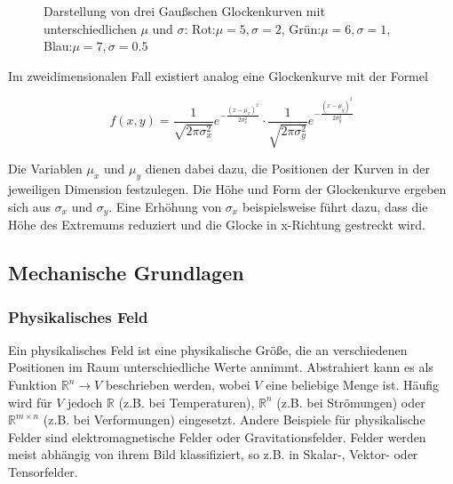 \documentclass[a4paper,fontsize=12pt,toc=bib,halfparskip]{scrartcl}
\begin{document}
\begin{figure}
	\centering
	\caption{Darstellung von drei Gau{\ss}schen Glockenkurven mit unterschiedlichen $\mu$ und $\sigma$: Rot:$\mu=5, \sigma=2$, Gr\"un:$\mu=6, \sigma=1$, Blau:$\mu=7, \sigma=0.5$}
	\label{Gauss}
\end{figure}

Im zweidimensionalen Fall existiert analog eine Glockenkurve mit der Formel

\begin{equation}
	f(x,y) = 
	\frac{1}{\sqrt{2\pi \sigma_x^2}}e^{-\frac{(x-\mu_x)^2}{2\sigma_x^2}} \cdot 
	\frac{1}{\sqrt{2\pi \sigma_y^2}}e^{-\frac{(x-\mu_y)^2}{2\sigma_y^2}}
\end{equation}

Die Variablen $\mu_x$ und $\mu_y$ dienen dabei dazu, die Positionen der Kurven in der jeweiligen Dimension festzulegen. Die H\"ohe und Form der Glockenkurve ergeben sich aus $\sigma_x$ und $\sigma_y$. Eine Erh\"ohung von $\sigma_x$ beispielsweise f\"uhrt dazu, dass die H\"ohe des Extremums reduziert und die Glocke in x-Richtung gestreckt wird.

\subsection{Mechanische Grundlagen}
\subsubsection{Physikalisches Feld}
Ein physikalisches Feld ist eine physikalische Gr\"o{\ss}e, die an verschiedenen Positionen im Raum unterschiedliche Werte annimmt\cite[1–2 Electric and magnetic fields]{feynman2011feynman}. Abstrahiert kann es als Funktion $\mathbb{R}^n \rightarrow V$ beschrieben werden, wobei $V$ eine beliebige Menge ist. H\"aufig wird f\"ur $V$ jedoch $\mathbb{R}$ (z.B. bei Temperaturen), $\mathbb{R}^n$ (z.B. bei Str\"omungen) oder $\mathbb{R}^{m\times n}$ (z.B. bei Verformungen) eingesetzt. Andere Beispiele f\"ur physikalische Felder sind elektromagnetische Felder oder Gravitationsfelder. Felder werden meist abh\"angig von ihrem Bild klassifiziert, so z.B. in Skalar-, Vektor- oder Tensorfelder.
\end{document}
